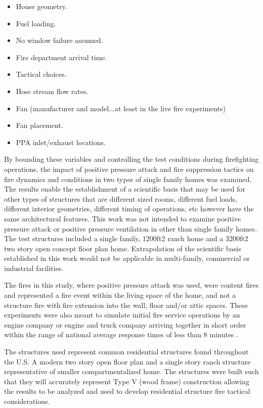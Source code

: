 \documentclass{article}
\begin{document}
\begin{itemize}
	\item House geometry.
	\item Fuel loading. 
	\item No window failure assumed.
	\item Fire department arrival time. 
	\item Tactical choices.
	\item Hose stream flow rates.
	\item Fan (manufacturer and model...at least in the live fire experiments)
	\item Fan placement.
	\item PPA inlet/exhaust locations. 
\end{itemize}

By bounding these variables and controlling the test conditions during firefighting operations, the impact of positive pressure attack and fire suppression tactics on fire dynamics and conditions in two types of single family homes was examined. The results enable the establishment of a scientific basis that may be used for other types of structures that are different sized rooms, different fuel loads, different interior geometries, different timing of operations, etc however have the same architectural features. This work was not intended to examine positive pressure attack or positive pressure ventilation in other than single family homes. The test structures included a single family, 1200ft2 ranch home and a 3200ft2 two story open concept floor plan home. Extrapolation of the scientific basis established in this work would not be applicable in multi-family, commercial or industrial facilities. 

The fires in this study, where positive pressure attack was used, were content fires and represented a fire event within the living space of the home, and not a structure fire with fire extension into the wall, floor and/or attic spaces. These experiments were also meant to simulate initial fire service operations by an engine company or engine and truck company arriving together in short order within the range of national average response times of less than 8 minutes \cite{USFA_Response_Times}.  

The structures used represent common residential structures found throughout the U.S. A modern two story open floor plan and a single story ranch structure representative of smaller compartmentalized home. The structures were built such that they will accurately represent Type V (wood frame) construction allowing the results to be analyzed and used to develop residential structure fire tactical considerations. 
\end{document}
